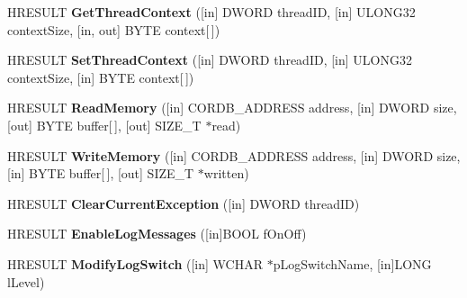 \begin{DoxyCompactItemize}
H\+R\+E\+S\+U\+LT {\bfseries Get\+Thread\+Context} (\mbox{[}in\mbox{]} D\+W\+O\+RD thread\+ID, \mbox{[}in\mbox{]} U\+L\+O\+N\+G32 context\+Size, \mbox{[}in, out\mbox{]} B\+Y\+TE context\mbox{[}$\,$\mbox{]})
\item 
\mbox{\label{interface_i_cor_debug_process_a569a4058a7948509c17fb7460d8d964a}} 
H\+R\+E\+S\+U\+LT {\bfseries Set\+Thread\+Context} (\mbox{[}in\mbox{]} D\+W\+O\+RD thread\+ID, \mbox{[}in\mbox{]} U\+L\+O\+N\+G32 context\+Size, \mbox{[}in\mbox{]} B\+Y\+TE context\mbox{[}$\,$\mbox{]})
\item 
\mbox{\label{interface_i_cor_debug_process_a78de2b84e4afec42a07522867a3f1e67}} 
H\+R\+E\+S\+U\+LT {\bfseries Read\+Memory} (\mbox{[}in\mbox{]} C\+O\+R\+D\+B\+\_\+\+A\+D\+D\+R\+E\+SS address, \mbox{[}in\mbox{]} D\+W\+O\+RD size, \mbox{[}out\mbox{]} B\+Y\+TE buffer\mbox{[}$\,$\mbox{]}, \mbox{[}out\mbox{]} S\+I\+Z\+E\+\_\+T $\ast$read)
\item 
\mbox{\label{interface_i_cor_debug_process_a7ccc7440d273e5aa62f803aa02827917}} 
H\+R\+E\+S\+U\+LT {\bfseries Write\+Memory} (\mbox{[}in\mbox{]} C\+O\+R\+D\+B\+\_\+\+A\+D\+D\+R\+E\+SS address, \mbox{[}in\mbox{]} D\+W\+O\+RD size, \mbox{[}in\mbox{]} B\+Y\+TE buffer\mbox{[}$\,$\mbox{]}, \mbox{[}out\mbox{]} S\+I\+Z\+E\+\_\+T $\ast$written)
\item 
\mbox{\label{interface_i_cor_debug_process_a58320497d076b8a98154e9157313f26a}} 
H\+R\+E\+S\+U\+LT {\bfseries Clear\+Current\+Exception} (\mbox{[}in\mbox{]} D\+W\+O\+RD thread\+ID)
\item 
\mbox{\label{interface_i_cor_debug_process_a39a3fbba4c40dfa4da39c015546f2499}} 
H\+R\+E\+S\+U\+LT {\bfseries Enable\+Log\+Messages} (\mbox{[}in\mbox{]}B\+O\+OL f\+On\+Off)
\item 
\mbox{\label{interface_i_cor_debug_process_a63757da2e3cae06ce7f16accf0686a6a}} 
H\+R\+E\+S\+U\+LT {\bfseries Modify\+Log\+Switch} (\mbox{[}in\mbox{]} W\+C\+H\+AR $\ast$p\+Log\+Switch\+Name, \mbox{[}in\mbox{]}L\+O\+NG l\+Level)
\item 
\mbox{\label{interface_i_cor_debug_process_ae6c7019a329abae27907ac9fb9975d0e}} 

\end{DoxyCompactItemize}
